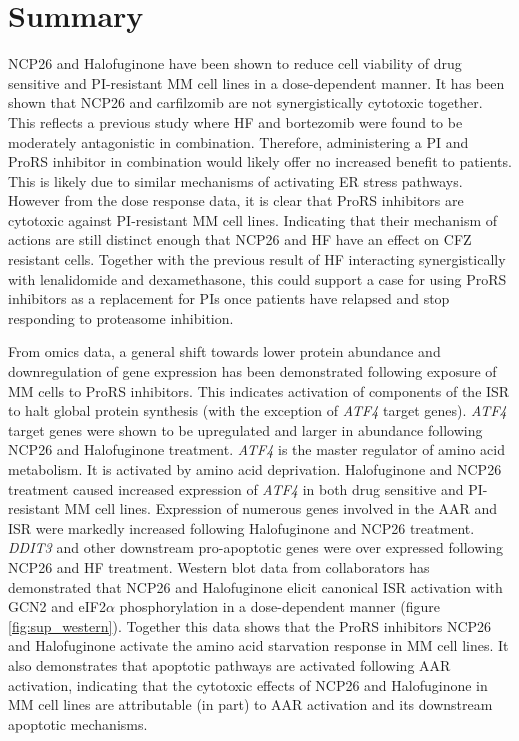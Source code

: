 \section{Summary}
NCP26 and Halofuginone have been shown to reduce cell viability of drug sensitive and PI-resistant MM cell lines in a dose-dependent manner.
It has been shown that NCP26 and carfilzomib are not synergistically cytotoxic together.
This reflects a previous study where HF and bortezomib were found to be moderately antagonistic in combination.
Therefore, administering a PI and ProRS inhibitor in combination would likely offer no increased benefit to patients.
This is likely due to similar mechanisms of activating ER stress pathways.
However from the dose response data, it is clear that ProRS inhibitors are cytotoxic against PI-resistant MM cell lines.
Indicating that their mechanism of actions are still distinct enough that NCP26 and HF have an effect on CFZ resistant cells.
Together with the previous result of HF interacting synergistically with lenalidomide and dexamethasone\cite{leiba2012halofuginone}, this could support a case for using ProRS inhibitors as a replacement for PIs once patients have relapsed and stop responding to proteasome inhibition.

From omics data, a general shift towards lower protein abundance and downregulation of gene expression has been demonstrated following exposure of MM cells to ProRS inhibitors.
This indicates activation of components of the ISR to halt global protein synthesis (with the exception of \textit{ATF4} target genes).
\textit{ATF4} target genes were shown to be upregulated and larger in abundance following NCP26 and Halofuginone treatment.
\textit{ATF4} is the master regulator of amino acid metabolism.
It is activated by amino acid deprivation.
Halofuginone and NCP26 treatment caused increased expression of \textit{ATF4} in both drug sensitive and PI-resistant MM cell lines.
Expression of numerous genes involved in the AAR and ISR were markedly increased following Halofuginone and NCP26 treatment.
\textit{DDIT3} and other downstream pro-apoptotic genes were over expressed following NCP26 and HF treatment.
Western blot data from collaborators has demonstrated that NCP26 and Halofuginone elicit canonical ISR activation with GCN2 and eIF2$\alpha$ phosphorylation in a dose-dependent manner (figure \ref{fig:sup_western}).
Together this data shows that the ProRS inhibitors NCP26 and Halofuginone activate the amino acid starvation response in MM cell lines.
It also demonstrates that apoptotic pathways are activated following AAR activation, indicating that the cytotoxic effects of NCP26 and Halofuginone in MM cell lines are attributable (in part) to AAR activation and its downstream apoptotic mechanisms.